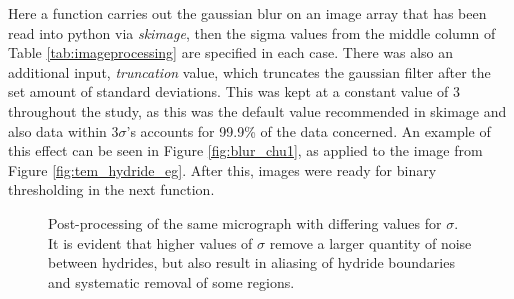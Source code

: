 \documentclass{article}
\begin{document}
	\noindent Here a function carries out the gaussian blur on an image array that has been read into python via \textit{skimage}, then the sigma values from the middle column of Table \ref{tab:imageprocessing} are specified in each case. There was also an additional input, \textit{truncation} value, which truncates the gaussian filter after the set amount of standard deviations. This was kept at a constant value of 3 throughout the study, as this was the default value recommended in skimage and also data within $3\sigma$'s accounts for 99.9\% of the data concerned. An example of this effect can be seen in Figure \ref{fig:blur_chu1}, as applied to the image from Figure \ref{fig:tem_hydride_eg}. After this, images were ready for binary thresholding in the next function.
	
	\begin{figure}[H]
		\centering
		\hfill
		\caption{Post-processing of the same micrograph with differing values for $\sigma$. It is evident that higher values of $\sigma$ remove a larger quantity of noise between hydrides, but also result in aliasing of hydride boundaries and systematic removal of some regions.}
		\label{fig:chu1gauss}
	\end{figure}
	
\end{document}
